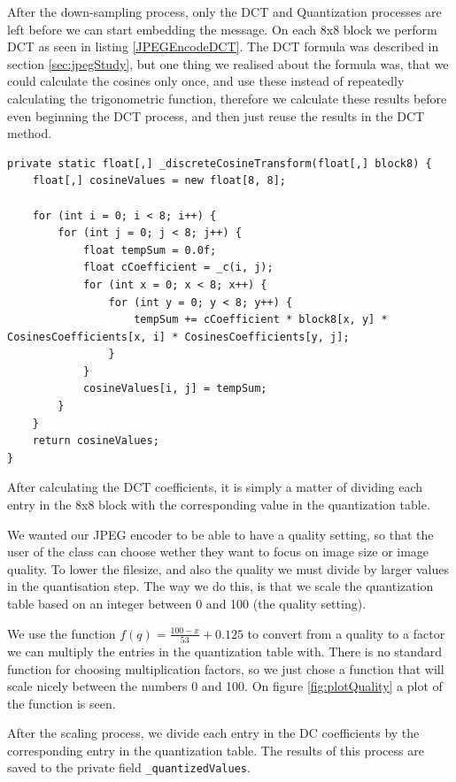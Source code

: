 After the down-sampling process, only the DCT and Quantization processes are left before we can start embedding the message.
On each 8x8 block we perform DCT as seen in listing \ref{JPEGEncodeDCT}.
The DCT formula was described in section \ref{sec:jpegStudy}, but one thing we realised about the formula was, that we could calculate the cosines only once, and use these instead of repeatedly calculating the trigonometric function, therefore we calculate these results before even beginning the DCT process, and then just reuse the results in the DCT method.
 

\begin{lstlisting}[firstnumber=603,label=JPEGEncodeDCT, caption={Multidimensional DCT on 8x8 block \textbf{File: }JPEGImage.cs}]
private static float[,] _discreteCosineTransform(float[,] block8) {
    float[,] cosineValues = new float[8, 8];

    for (int i = 0; i < 8; i++) {
        for (int j = 0; j < 8; j++) {
            float tempSum = 0.0f;
            float cCoefficient = _c(i, j);
            for (int x = 0; x < 8; x++) {
                for (int y = 0; y < 8; y++) {
                    tempSum += cCoefficient * block8[x, y] * CosinesCoefficients[x, i] * CosinesCoefficients[y, j];
                }
            }
            cosineValues[i, j] = tempSum;
        }
    }
    return cosineValues;
}
\end{lstlisting}

\FloatBarrier

After calculating the DCT coefficients, it is simply a matter of dividing each entry in the 8x8 block with the corresponding value in the quantization table.

We wanted our JPEG encoder to be able to have a quality setting, so that the user of the class can choose wether they want to focus on image size or image quality. To lower the filesize, and also the quality we must divide by larger values in the quantisation step. The way we do this, is that we scale the quantization table based on an integer between 0 and 100 (the quality setting).

We use the function $f(q) = \frac{100-x}{53}+0.125$ to convert from a quality to a factor we can multiply the entries in the quantization table with. There is no standard function for choosing multiplication factors, so we just chose a function that will scale nicely between the numbers 0 and 100. On figure \ref{fig:plotQuality} a plot of the function is seen.

After the scaling process, we divide each entry in the DC coefficients by the corresponding entry in the quantization table. The results of this process are saved to the private field \lstinline|_quantizedValues|.



